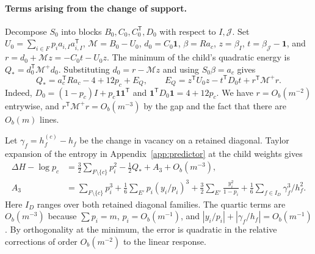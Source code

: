 \paragraph{Terms arising from the change of support.} Decompose \(S_0\) into blocks
\(B_0,C_0,C_0^{\mathsf T},D_0\) with respect to \(I,\mathcal J\). Set \(U_0=\sum_{i\in F}p_i
a_{i,I}a_{i,I}^{\mathsf T}\), \(\mathcal M=B_0-U_0\), \(d_0=C_0\mathbf1\), \(\beta=Ra_c\), \(z=\beta_I\),
\(t=\beta_{\mathcal J}-\mathbf1\), and \(r=d_0+\mathcal M z=-C_0t-U_0z\). The minimum of the child's
quadratic energy is \(Q_*=d_0^{\mathsf T}\mathcal M^+d_0\). Substituting \(d_0=r-\mathcal Mz\) and using
\(S_0\beta=a_c\) gives \[
 Q_*=a_c^{\mathsf T}Ra_c-4+12p_c+E_Q,\qquad
 E_Q=z^{\mathsf T}U_0z-t^{\mathsf T}D_0t+r^{\mathsf T}\mathcal M^+r .
\] Indeed, \(D_0=(1-p_c)I+p_c\mathbf1\mathbf1^{\mathsf T}\) and \(\mathbf1^{\mathsf
T}D_0\mathbf1=4+12p_c\). We have \(r=O_b(m^{-2})\) entrywise, and \(r^{\mathsf T}\mathcal
M^+r=O_b(m^{-3})\) by the gap and the fact that there are \(O_b(m)\) lines.

Let \(\gamma_f=h_f^{(c)}-h_f\) be the change in vacancy on a retained diagonal. Taylor expansion of the
entropy in Appendix~\ref{app:predictor} at the child weights gives \begin{align*}
 \Delta H-\log p_c&=\tfrac32\sum_{F\setminus\{c\}}p_i^2-\tfrac12 Q_*+A_3+O_b(m^{-3}),\\
 A_3&=\sum_{F\setminus\{c\}}p_i^3+\tfrac16\sum_{E'}p_i(y_i/p_i)^3
 +\tfrac32\sum_{E'}\frac{y_i^2}{1-p_i}+\tfrac16\sum_{f\in I_D}\gamma_f^3/h_f^2 .
\end{align*} Here \(I_D\) ranges over both retained diagonal families. The quartic terms are
\(O_b(m^{-3})\) because \(\sum p_i=m\), \(p_i=O_b(m^{-1})\), and
\(|y_i/p_i|+|\gamma_f/h_f|=O_b(m^{-1})\). By orthogonality at the minimum, the error is quadratic in the
relative corrections of order \(O_b(m^{-2})\) to the linear response.

